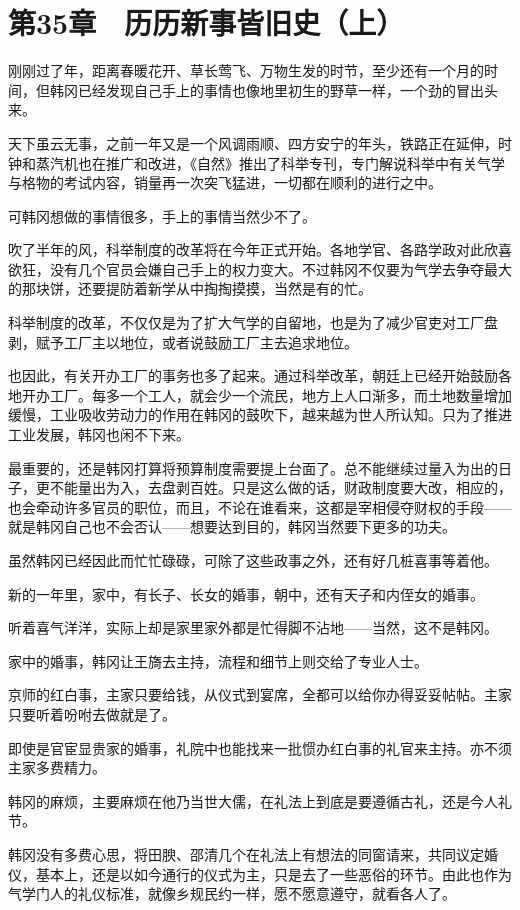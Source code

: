 \section{第35章　历历新事皆旧史（上）}

刚刚过了年，距离春暖花开、草长莺飞、万物生发的时节，至少还有一个月的时间，但韩冈已经发现自己手上的事情也像地里初生的野草一样，一个劲的冒出头来。

天下虽云无事，之前一年又是一个风调雨顺、四方安宁的年头，铁路正在延伸，时钟和蒸汽机也在推广和改进，《自然》推出了科举专刊，专门解说科举中有关气学与格物的考试内容，销量再一次突飞猛进，一切都在顺利的进行之中。

可韩冈想做的事情很多，手上的事情当然少不了。

吹了半年的风，科举制度的改革将在今年正式开始。各地学官、各路学政对此欣喜欲狂，没有几个官员会嫌自己手上的权力变大。不过韩冈不仅要为气学去争夺最大的那块饼，还要提防着新学从中掏掏摸摸，当然是有的忙。

科举制度的改革，不仅仅是为了扩大气学的自留地，也是为了减少官吏对工厂盘剥，赋予工厂主以地位，或者说鼓励工厂主去追求地位。

也因此，有关开办工厂的事务也多了起来。通过科举改革，朝廷上已经开始鼓励各地开办工厂。每多一个工人，就会少一个流民，地方上人口渐多，而土地数量增加缓慢，工业吸收劳动力的作用在韩冈的鼓吹下，越来越为世人所认知。只为了推进工业发展，韩冈也闲不下来。

最重要的，还是韩冈打算将预算制度需要提上台面了。总不能继续过量入为出的日子，更不能量出为入，去盘剥百姓。只是这么做的话，财政制度要大改，相应的，也会牵动许多官员的职位，而且，不论在谁看来，这都是宰相侵夺财权的手段——就是韩冈自己也不会否认——想要达到目的，韩冈当然要下更多的功夫。

虽然韩冈已经因此而忙忙碌碌，可除了这些政事之外，还有好几桩喜事等着他。

新的一年里，家中，有长子、长女的婚事，朝中，还有天子和内侄女的婚事。

听着喜气洋洋，实际上却是家里家外都是忙得脚不沾地——当然，这不是韩冈。

家中的婚事，韩冈让王旖去主持，流程和细节上则交给了专业人士。

京师的红白事，主家只要给钱，从仪式到宴席，全都可以给你办得妥妥帖帖。主家只要听着吩咐去做就是了。

即使是官宦显贵家的婚事，礼院中也能找来一批惯办红白事的礼官来主持。亦不须主家多费精力。

韩冈的麻烦，主要麻烦在他乃当世大儒，在礼法上到底是要遵循古礼，还是今人礼节。

韩冈没有多费心思，将田腴、邵清几个在礼法上有想法的同窗请来，共同议定婚仪，基本上，还是以如今通行的仪式为主，只是去了一些恶俗的环节。由此也作为气学门人的礼仪标准，就像乡规民约一样，愿不愿意遵守，就看各人了。


